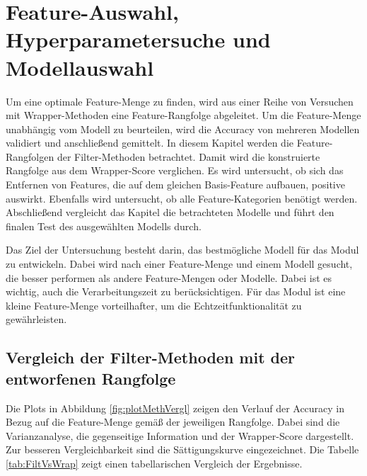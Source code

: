 \section{Feature-Auswahl, Hyperparametersuche und Modellauswahl} \label{sec:Ergeb FeatSel,Hyp,ModSel}
Um eine optimale Feature-Menge zu finden, wird aus einer Reihe von Versuchen mit Wrapper-Methoden eine Feature-Rangfolge abgeleitet. Um die Feature-Menge unabhängig vom Modell zu beurteilen, wird die Accuracy von mehreren Modellen validiert und anschließend gemittelt. In diesem Kapitel werden die Feature-Rangfolgen der Filter-Methoden betrachtet. Damit wird die konstruierte Rangfolge aus dem Wrapper-Score verglichen. Es wird untersucht, ob sich das Entfernen von Features, die auf dem gleichen Basis-Feature aufbauen, positive auswirkt. Ebenfalls wird untersucht, ob alle Feature-Kategorien benötigt werden. Abschließend vergleicht das Kapitel die betrachteten Modelle und führt den finalen Test des ausgewählten Modells durch.\par

Das Ziel der Untersuchung besteht darin, das bestmögliche Modell für das Modul zu entwickeln. Dabei wird nach einer Feature-Menge und einem Modell gesucht, die besser performen als andere Feature-Mengen oder Modelle. Dabei ist es wichtig, auch die Verarbeitungszeit zu berücksichtigen. Für das Modul ist eine kleine Feature-Menge vorteilhafter, um die Echtzeitfunktionalität zu gewährleisten. \par


\subsection{Vergleich der Filter-Methoden mit der entworfenen Rangfolge}
Die Plots in Abbildung \ref{fig:plotMethVergl} zeigen den Verlauf der Accuracy in Bezug auf die Feature-Menge gemäß der jeweiligen Rangfolge. Dabei sind die Varianzanalyse, die gegenseitige Information und der Wrapper-Score dargestellt. Zur besseren Vergleichbarkeit sind die Sättigungskurve eingezeichnet. Die Tabelle \ref{tab:FiltVsWrap} zeigt einen tabellarischen Vergleich der Ergebnisse.

